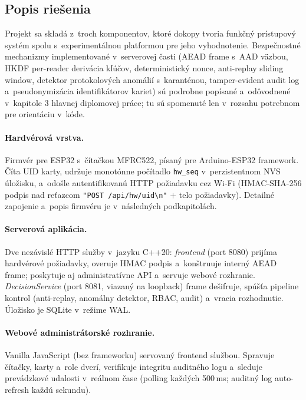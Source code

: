 \documentclass[a4paper]{feidipsp}
\begin{document}
\subsection{Popis riešenia}
\label{sec:popis-riesenia}

Projekt sa skladá z~troch komponentov, ktoré dokopy tvoria funkčný prístupový systém spolu s~experimentálnou platformou pre jeho vyhodnotenie. Bezpečnostné mechanizmy implementované v~serverovej časti (AEAD frame s~AAD väzbou, HKDF per-reader derivácia kľúčov, deterministický nonce, anti-replay sliding window, detektor protokolových anomálií s~karanténou, tamper-evident audit log a~pseudonymizácia identifikátorov kariet) sú podrobne popísané a~odôvodnené v~kapitole 3 hlavnej diplomovej práce; tu sú spomenuté len v~rozsahu potrebnom pre orientáciu v~kóde.

\paragraph{Hardvérová vrstva.} Firmvér pre ESP32 s~čítačkou MFRC522, písaný pre Arduino-ESP32 framework. Číta UID karty, udržuje monotónne počítadlo \texttt{hw\_seq} v~perzistentnom NVS úložisku, a~odošle autentifikovanú HTTP požiadavku cez Wi-Fi (HMAC-SHA-256 podpis nad reťazcom \texttt{"POST /api/hw/uid\textbackslash n"} $+$ telo požiadavky). Detailné zapojenie a~popis firmvéru je v~následných podkapitolách.

\paragraph{Serverová aplikácia.} Dve nezávislé HTTP služby v~jazyku C++20: \emph{frontend} (port 8080) prijíma hardvérové požiadavky, overuje HMAC podpis a~konštruuje interný AEAD frame; poskytuje aj administratívne API a~servuje webové rozhranie. \emph{DecisionService} (port 8081, viazaný na loopback) frame dešifruje, spúšťa pipeline kontrol (anti-replay, anomálny detektor, RBAC, audit) a~vracia rozhodnutie. Úložisko je SQLite v~režime WAL.

\paragraph{Webové administrátorské rozhranie.} Vanilla JavaScript (bez frameworku) servovaný frontend službou. Spravuje čítačky, karty a~role dverí, verifikuje integritu auditného logu a~sleduje prevádzkové udalosti v~reálnom čase (polling každých 500\,ms; auditný log auto-refresh každú sekundu).
\end{document}
